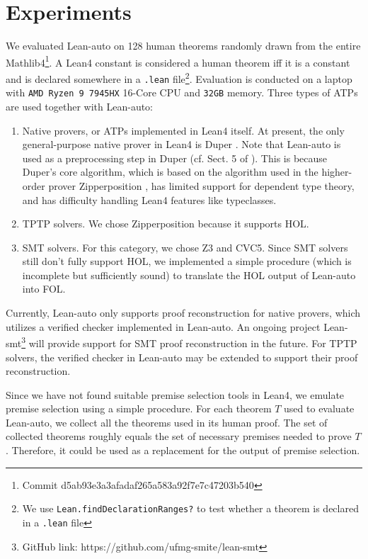 \section{Experiments}\label{sectexpr}

  We evaluated Lean-auto on 128 human theorems randomly drawn from the entire
  Mathlib4\footnote{Commit d5ab93e3a3afadaf265a583a92f7e7c47203b540}. A
  Lean4 constant is considered a human theorem iff it is a constant and
  is declared somewhere in a \texttt{.lean} file\footnote{We use
  \texttt{Lean.findDeclarationRanges?} to test whether a theorem is
  declared in a \texttt{.lean} file}. Evaluation is conducted on a laptop
  with \texttt{AMD Ryzen 9 7945HX} 16-Core CPU and \texttt{32GB} memory.
  Three types of ATPs are used together with Lean-auto:
  \begin{enumerate}
    \item Native provers, or ATPs implemented in Lean4 itself. At present, the only general-purpose
      native prover in Lean4 is Duper \cite{DuperPaper}. Note that Lean-auto is
      used as a preprocessing step in Duper (cf. Sect. 5 of \cite{DuperPaper}).
      This is because Duper's core algorithm, which is based on the algorithm used
      in the higher-order prover Zipperposition \cite{ZipperpositionMakeWork}, has limited support for dependent
      type theory, and has difficulty handling Lean4 features like typeclasses.
    \item TPTP solvers. We chose Zipperposition because it supports HOL.
    \item SMT solvers. For this category, we chose Z3 and CVC5. Since SMT solvers
      still don't fully support HOL, we implemented a simple procedure
      (which is incomplete but sufficiently sound) to translate the HOL output of Lean-auto into FOL.
  \end{enumerate}

  Currently, Lean-auto only supports proof reconstruction for native provers,
  which utilizes a verified checker implemented in Lean-auto. An
  ongoing project Lean-smt\footnote{GitHub link: https://github.com/ufmg-smite/lean-smt}
  will provide support for SMT proof reconstruction in the future. For TPTP solvers,
  the verified checker in Lean-auto may be extended to support their proof reconstruction.

  Since we have not found suitable premise selection tools in Lean4, we emulate
  premise selection using a simple procedure. For each theorem $T$ used to evaluate
  Lean-auto, we collect all the theorems used in its human proof. The set of collected theorems
  roughly equals the set of necessary premises needed to prove $T$. Therefore, it could
  be used as a replacement for the output of premise selection.

